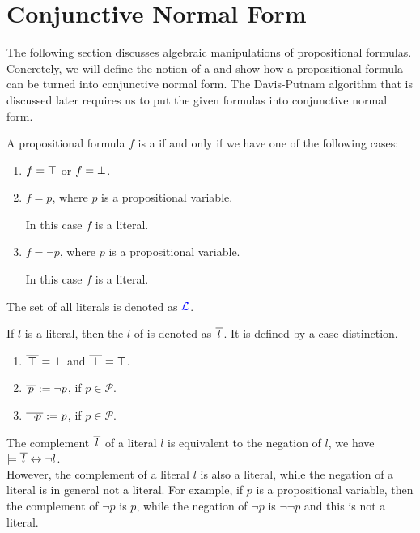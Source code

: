 \section{Conjunctive Normal Form}
The following section discusses algebraic manipulations of propositional formulas.  Concretely, we will define
the notion of a  and show how a propositional formula can be turned into
conjunctive normal form.  The Davis-Putnam algorithm that is discussed later requires us to put the given
formulas into conjunctive normal form.

\begin{Definition}[Literal]
  A propositional formula $f$ is a  if and only if we have one of the following cases: 
  \begin{enumerate}
  \item $f = \top$ or $f = \bot$.
  \item $f = p$, where $p$ is a propositional variable.

        In this case $f$ is a  literal.
  \item $f = \neg p$, where $p$ is a propositional variable. 

        In this case $f$ is a  literal.
  \end{enumerate}
  The set of all literals is denoted as  ${\color{blue}\mathcal{L}}$.  \eox
\end{Definition}

If  $l$ is a literal, then the  $l$ of is denoted as $\overline{\,l\,}$.
It is defined by a case distinction.
\begin{enumerate}
\item $\overline{\,\top\,} = \bot$ \quad and \quad $\overline{\,\bot\,} = \top$. 
\item $\overline{\,p\,} := \neg p$, \quad if $p \in \mathcal{P}$.
\item $\overline{\,\neg p\,} := p$, \quad if $p \in \mathcal{P}$.
\end{enumerate}
The complement $\overline{\,l\,}$ of a literal $l$ is equivalent to the negation of $l$, we have
\\[0.2cm]
\hspace*{1.3cm}
$\models \overline{\,l\,} \leftrightarrow \neg l$.
\\[0.2cm]
However, the complement of a literal $l$ is also a literal, while the negation of a literal is in general not a
literal. For example, if $p$ is a propositional variable, then the complement of $\neg p$ is $p$, while the
negation of $\neg p$ is $\neg \neg p$ and this is not a literal.

